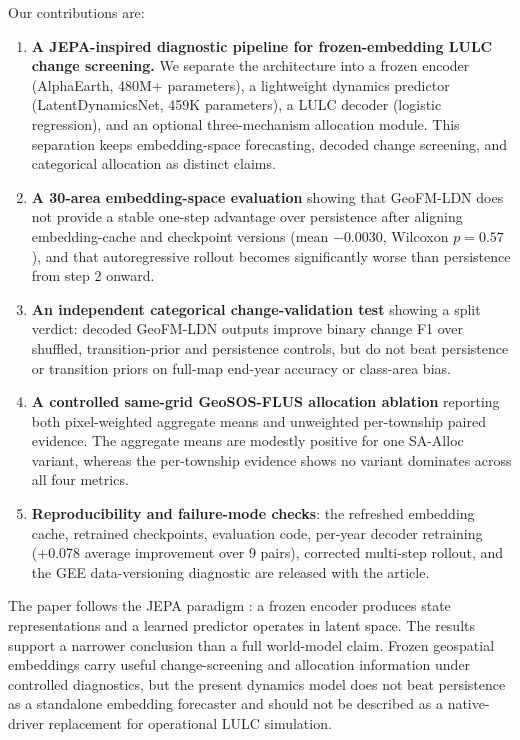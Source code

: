 \documentclass{article}
\begin{document}
Our contributions are:

\begin{enumerate}
\item \textbf{A JEPA-inspired diagnostic pipeline for frozen-embedding LULC change screening.} We separate the architecture into a frozen encoder (AlphaEarth, 480M+ parameters), a lightweight dynamics predictor (LatentDynamicsNet, 459K parameters), a LULC decoder (logistic regression), and an optional three-mechanism allocation module. This separation keeps embedding-space forecasting, decoded change screening, and categorical allocation as distinct claims.

\item \textbf{A 30-area embedding-space evaluation} showing that GeoFM-LDN does not provide a stable one-step advantage over persistence after aligning embedding-cache and checkpoint versions (mean $-0.0030$, Wilcoxon $p=0.57$), and that autoregressive rollout becomes significantly worse than persistence from step 2 onward.

\item \textbf{An independent categorical change-validation test} showing a split verdict: decoded GeoFM-LDN outputs improve binary change F1 over shuffled, transition-prior and persistence controls, but do not beat persistence or transition priors on full-map end-year accuracy or class-area bias.

\item \textbf{A controlled same-grid GeoSOS-FLUS allocation ablation} reporting both pixel-weighted aggregate means and unweighted per-township paired evidence. The aggregate means are modestly positive for one SA-Alloc variant, whereas the per-township evidence shows no variant dominates across all four metrics.

\item \textbf{Reproducibility and failure-mode checks}: the refreshed embedding cache, retrained checkpoints, evaluation code, per-year decoder retraining (+0.078 average improvement over 9 pairs), corrected multi-step rollout, and the GEE data-versioning diagnostic are released with the article.
\end{enumerate}

The paper follows the JEPA paradigm \citep{lecun2022jepa}: a frozen encoder produces state representations and a learned predictor operates in latent space. The results support a narrower conclusion than a full world-model claim. Frozen geospatial embeddings carry useful change-screening and allocation information under controlled diagnostics, but the present dynamics model does not beat persistence as a standalone embedding forecaster and should not be described as a native-driver replacement for operational LULC simulation.
\end{document}
